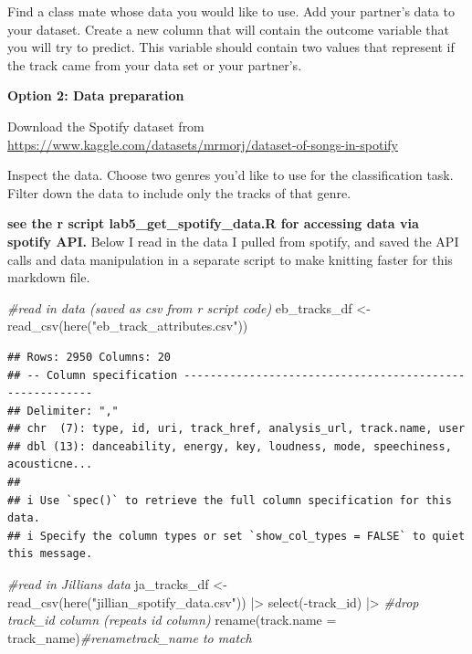 \documentclass[
]{article}
\newenvironment{Shaded}{\begin{snugshade}}{\end{snugshade}}
\newcommand{\AttributeTok}[1]{\textcolor[rgb]{0.77,0.63,0.00}{#1}}
\newcommand{\CommentTok}[1]{\textcolor[rgb]{0.56,0.35,0.01}{\textit{#1}}}
\newcommand{\FunctionTok}[1]{\textcolor[rgb]{0.00,0.00,0.00}{#1}}
\newcommand{\NormalTok}[1]{#1}
\newcommand{\OtherTok}[1]{\textcolor[rgb]{0.56,0.35,0.01}{#1}}
\newcommand{\SpecialCharTok}[1]{\textcolor[rgb]{0.00,0.00,0.00}{#1}}
\newcommand{\StringTok}[1]{\textcolor[rgb]{0.31,0.60,0.02}{#1}}
\begin{document}
Find a class mate whose data you would like to use. Add your partner's
data to your dataset. Create a new column that will contain the outcome
variable that you will try to predict. This variable should contain two
values that represent if the track came from your data set or your
partner's.

\textbf{Option 2: Data preparation}

Download the Spotify dataset from
\url{https://www.kaggle.com/datasets/mrmorj/dataset-of-songs-in-spotify}

Inspect the data. Choose two genres you'd like to use for the
classification task. Filter down the data to include only the tracks of
that genre.

\textbf{see the r script lab5\_get\_spotify\_data.R for accessing data
via spotify API.} Below I read in the data I pulled from spotify, and
saved the API calls and data manipulation in a separate script to make
knitting faster for this markdown file.

\begin{Shaded}
\begin{Highlighting}[]
\CommentTok{\#read in data (saved as csv from r script code)}
\NormalTok{eb\_tracks\_df }\OtherTok{\textless{}{-}} \FunctionTok{read\_csv}\NormalTok{(}\FunctionTok{here}\NormalTok{(}\StringTok{"eb\_track\_attributes.csv"}\NormalTok{))}
\end{Highlighting}
\end{Shaded}

\begin{verbatim}
## Rows: 2950 Columns: 20
## -- Column specification --------------------------------------------------------
## Delimiter: ","
## chr  (7): type, id, uri, track_href, analysis_url, track.name, user
## dbl (13): danceability, energy, key, loudness, mode, speechiness, acousticne...
## 
## i Use `spec()` to retrieve the full column specification for this data.
## i Specify the column types or set `show_col_types = FALSE` to quiet this message.
\end{verbatim}

\begin{Shaded}
\begin{Highlighting}[]
\CommentTok{\#read in Jillian\textquotesingle{}s data}
\NormalTok{ja\_tracks\_df }\OtherTok{\textless{}{-}} \FunctionTok{read\_csv}\NormalTok{(}\FunctionTok{here}\NormalTok{(}\StringTok{"jillian\_spotify\_data.csv"}\NormalTok{)) }\SpecialCharTok{|\textgreater{}} 
  \FunctionTok{select}\NormalTok{(}\SpecialCharTok{{-}}\NormalTok{track\_id) }\SpecialCharTok{|\textgreater{}} \CommentTok{\#drop track\_id column (repeats id column)}
  \FunctionTok{rename}\NormalTok{(}\AttributeTok{track.name =}\NormalTok{ track\_name)}\CommentTok{\#renametrack\_name to match}
\end{Highlighting}
\end{Shaded}
\end{document}
